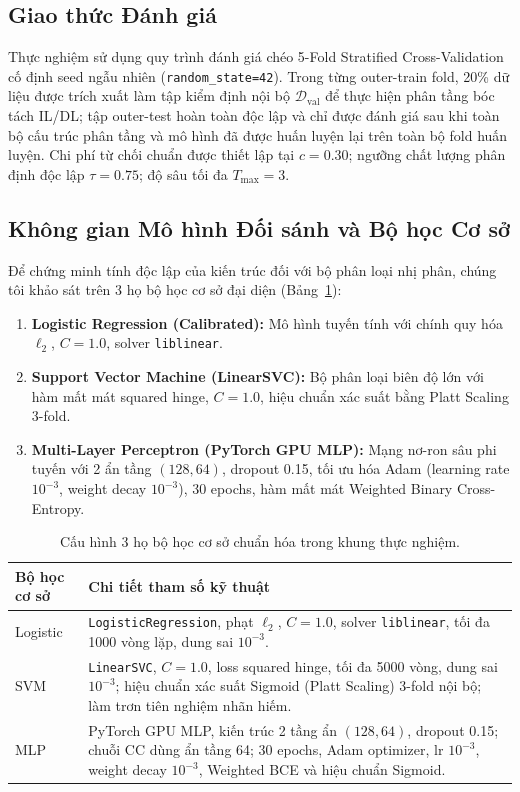 \documentclass[11pt,a4paper]{article}
\begin{document}
\subsection{Giao thức Đánh giá}
Thực nghiệm sử dụng quy trình đánh giá chéo 5-Fold Stratified Cross-Validation cố định seed ngẫu nhiên (\texttt{random\_state=42}). Trong từng outer-train fold, 20\% dữ liệu được trích xuất làm tập kiểm định nội bộ $\mathcal{D}_{\text{val}}$ để thực hiện phân tầng bóc tách IL/DL; tập outer-test hoàn toàn độc lập và chỉ được đánh giá sau khi toàn bộ cấu trúc phân tầng và mô hình đã được huấn luyện lại trên toàn bộ fold huấn luyện. Chi phí từ chối chuẩn được thiết lập tại $c = 0.30$; ngưỡng chất lượng phân định độc lập $\tau = 0.75$; độ sâu tối đa $T_{\max} = 3$.

\subsection{Không gian Mô hình Đối sánh và Bộ học Cơ sở}
Để chứng minh tính độc lập của kiến trúc đối với bộ phân loại nhị phân, chúng tôi khảo sát trên 3 họ bộ học cơ sở đại diện (Bảng~\ref{tab:base_learners}):
\begin{enumerate}
    \item \textbf{Logistic Regression (Calibrated):} Mô hình tuyến tính với chính quy hóa $\ell_2$, $C=1.0$, solver \texttt{liblinear}.
    \item \textbf{Support Vector Machine (LinearSVC):} Bộ phân loại biên độ lớn với hàm mất mát squared hinge, $C=1.0$, hiệu chuẩn xác suất bằng Platt Scaling 3-fold.
    \item \textbf{Multi-Layer Perceptron (PyTorch GPU MLP):} Mạng nơ-ron sâu phi tuyến với 2 ẩn tầng $(128, 64)$, dropout 0.15, tối ưu hóa Adam (learning rate $10^{-3}$, weight decay $10^{-3}$), 30 epochs, hàm mất mát Weighted Binary Cross-Entropy.
\end{enumerate}

\begin{table}[htbp]
\centering
\caption{Cấu hình 3 họ bộ học cơ sở chuẩn hóa trong khung thực nghiệm.}
\label{tab:base_learners}
\footnotesize
\begin{tabular}{lp{12.5cm}}
\toprule
\textbf{Bộ học cơ sở} & \textbf{Chi tiết tham số kỹ thuật} \\
\midrule
Logistic & \texttt{LogisticRegression}, phạt $\ell_2$, $C = 1.0$, solver \texttt{liblinear}, tối đa 1000 vòng lặp, dung sai $10^{-3}$. \\
SVM & \texttt{LinearSVC}, $C = 1.0$, loss squared hinge, tối đa 5000 vòng, dung sai $10^{-3}$; hiệu chuẩn xác suất Sigmoid (Platt Scaling) 3-fold nội bộ; làm trơn tiên nghiệm nhãn hiếm. \\
MLP & PyTorch GPU MLP, kiến trúc 2 tầng ẩn $(128, 64)$, dropout 0.15; chuỗi CC dùng ẩn tầng 64; 30 epochs, Adam optimizer, lr $10^{-3}$, weight decay $10^{-3}$, Weighted BCE và hiệu chuẩn Sigmoid. \\
\bottomrule
\end{tabular}
\end{table}
\end{document}
